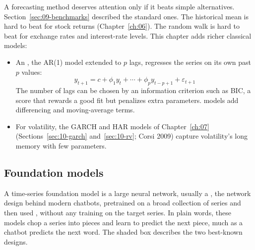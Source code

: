A forecasting method deserves attention only if it beats simple alternatives. Section~\ref{sec:09-benchmarks} described the standard ones. The historical mean is hard to beat for stock returns (Chapter~\ref{ch:06}). The random walk is hard to beat for exchange rates and interest-rate levels. This chapter adds richer classical models:
\begin{itemize}
  \item An , the AR(1) model extended to $p$ lags, regresses the series on its own past $p$ values:
  \begin{equation}
    y_{t+1} = c + \phi_1 y_t + \cdots + \phi_p y_{t-p+1} + \varepsilon_{t+1}
    \label{eq:21-ar}
  \end{equation}
  The number of lags can be chosen by an information criterion such as BIC, a score that rewards a good fit but penalizes extra parameters.  models add differencing and moving-average terms.
  \item For volatility, the GARCH and HAR models of Chapter~\ref{ch:07} (Sections~\ref{sec:10-garch} and~\ref{sec:10-rv}; Corsi 2009) capture volatility's long memory with few parameters.
\end{itemize}

\subsection{Foundation models}
\label{sec:21-fm}

A time-series foundation model is a large neural network, usually a \label{kt:transformer}, the network design behind modern chatbots, pretrained on a broad collection of series and then used , without any training on the target series. In plain words, these models chop a series into pieces and learn to predict the next piece, much as a chatbot predicts the next word. The shaded box describes the two best-known designs.

